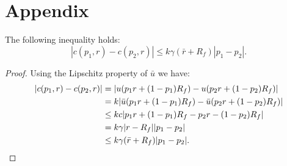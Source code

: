 \section*{Appendix}
\begin{claim}
  \label{claim0}
  The following inequality holds:
  \begin{equation*}
    |c(p_1,r) - c(p_2,r)| \leq k\gamma(\bar r+R_f)|p_1-p_2|.
  \end{equation*}
\end{claim}
\begin{proof}
  Using the Lipschitz property of $\bar u$ we have:
  \begin{align*}
    |c(p_1,r) - c(p_2,r)| &= |u(p_1r + (1-p_1)R_f) - u(p_2r + (1-p_2)R_f)|\\
    &= k|\bar u(p_1 r + (1-p_1)R_f) - \bar u(p_2 r + (1-p_2)R_f)|\\
    &\leq k c |p_1 r + (1-p_1)R_f - p_2r - (1-p_2)R_f|\\
    &= k\gamma |r-R_f||p_1-p_2|\\
    &\leq k\gamma(\bar r+R_f)|p_1-p_2|.\qedhere
  \end{align*}
\end{proof}


